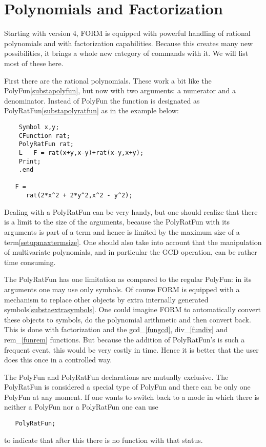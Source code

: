 
\chapter{Polynomials and Factorization}
\label{polynomials}

\noindent Starting with version 4, FORM is equipped with powerful handling 
of rational polynomials and with factorization capabilities. Because this 
creates many new possibilities, it brings a whole new category of commands 
with it. We will list most of these here.

\noindent First there are the rational polynomials. These work a bit like 
the PolyFun\ref{substapolyfun}, but now with two arguments: a numerator and 
a denominator. Instead of PolyFun the function is designated as 
PolyRatFun\ref{substapolyratfun} as in the example below:
\begin{verbatim}
    Symbol x,y;
    CFunction rat;
    PolyRatFun rat;
    L   F = rat(x+y,x-y)+rat(x-y,x+y);
    Print;
    .end

   F =
      rat(2*x^2 + 2*y^2,x^2 - y^2);
\end{verbatim}
Dealing with a PolyRatFun can be very handy, but one should realize that 
there is a limit to the size of the arguments, because the PolyRatFun with 
its arguments is part of a term and hence is limited by the maximum size of 
a term\ref{setupmaxtermsize}. One should also take into account that the 
manipulation of multivariate polynomials, and in particular the GCD 
operation, can be rather time consuming.

\noindent The PolyRatFun has one limitation as compared to the regular 
PolyFun: in its arguments one may use only symbols. Of course FORM is 
equipped with a mechanism to replace other objects by extra internally 
generated symbols\ref{substaextrasymbols}. One could imagine FORM to 
automatically convert these objects to symbols, do the polynomial 
arithmetic and then convert back. This is done with factorization and the 
gcd\_\ref{fungcd}, 
div\_\ref{fundiv} 
and rem\_\ref{funrem} functions. But 
because the addition of PolyRatFun's is such a frequent event, this would 
be very costly in time. Hence it is better that the user does this once 
in a controlled way.

\noindent The PolyFun and PolyRatFun declarations are mutually exclusive. 
The PolyRatFun is considered a special type of PolyFun and there can be 
only one PolyFun at any moment. If one wants to switch back to a mode in 
which there is neither a PolyFun nor a PolyRatFun one can use
\begin{verbatim}
   PolyRatFun;
\end{verbatim}
to indicate that after this there is no function with that status.

